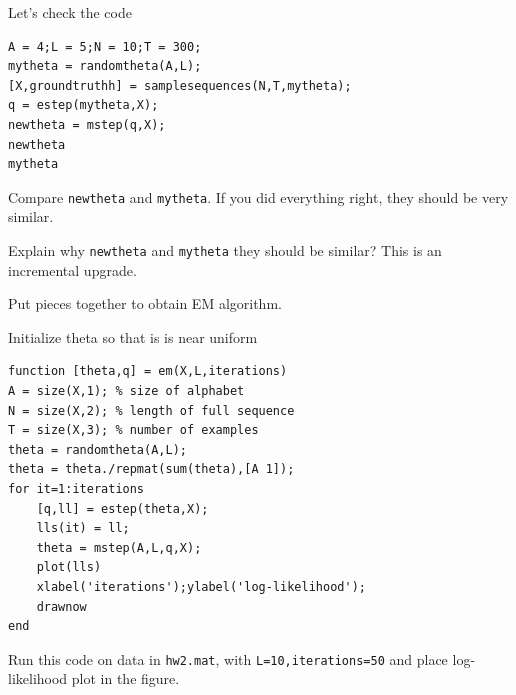 \documentclass{article}
\begin{document}
{Let's check the code
\begin{verbatim}
A = 4;L = 5;N = 10;T = 300;
mytheta = randomtheta(A,L);
[X,groundtruthh] = samplesequences(N,T,mytheta);
q = estep(mytheta,X);
newtheta = mstep(q,X);
newtheta
mytheta
\end{verbatim}

Compare \verb|newtheta| and \verb|mytheta|. If you did everything right, they should be very similar.

Explain why \verb|newtheta|  and \verb|mytheta| they should be similar? This is an incremental upgrade.

\newproblem{2pt} Put pieces together to obtain EM algorithm.

Initialize theta so that is is near uniform

\begin{verbatim}
function [theta,q] = em(X,L,iterations)
A = size(X,1); % size of alphabet
N = size(X,2); % length of full sequence
T = size(X,3); % number of examples
theta = randomtheta(A,L);
theta = theta./repmat(sum(theta),[A 1]);
for it=1:iterations
    [q,ll] = estep(theta,X);
    lls(it) = ll;
    theta = mstep(A,L,q,X);
    plot(lls)
    xlabel('iterations');ylabel('log-likelihood');
    drawnow
end
\end{verbatim}

Run this code on data in \verb|hw2.mat|, with \verb|L=10,iterations=50| and place log-likelihood plot in the figure.

}
\end{document}
